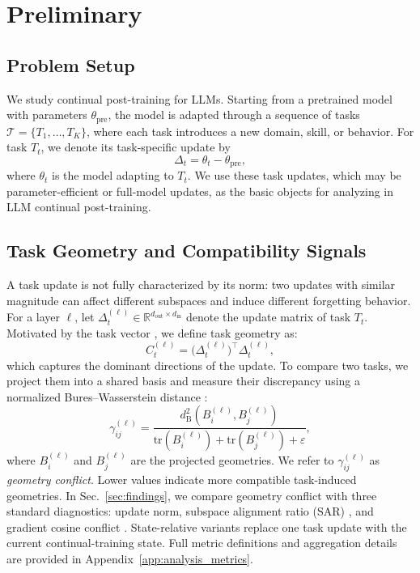\documentclass{article}
\begin{document}
\vspace{-0.2em}
\section{Preliminary}
\label{sec:background}


\subsection{Problem Setup}
We study continual post-training for LLMs. Starting from a pretrained model with parameters \(\theta_{\mathrm{pre}}\), the model is adapted through a sequence of tasks \(\mathcal{T}=\{T_1,\ldots,T_K\}\), where each task introduces a new domain, skill, or behavior. For task \(T_t\), we denote its task-specific update by
\[
\Delta_t = \theta_t - \theta_{\mathrm{pre}},
\]
where \(\theta_t\) is the model adapting to \(T_t\). We use these task updates, which may be parameter-efficient or full-model updates, as the basic objects for analyzing in LLM continual post-training.


\subsection{Task Geometry and Compatibility Signals}
\label{sec:task_geo_comp_sig}
A task update is not fully characterized by its norm: two updates with similar magnitude can affect different subspaces and induce different forgetting behavior. For a layer \(\ell\), let \(\Delta_t^{(\ell)} \in \mathbb{R}^{d_{\mathrm{out}}\times d_{\mathrm{in}}}\) denote the update matrix of task \(T_t\). 
Motivated by the task vector \cite{ilharcoediting}, we define task geometry as:
{\footnotesize
\[
C_t^{(\ell)} = \big(\Delta_t^{(\ell)}\big)^\top \Delta_t^{(\ell)} ,
\]
}
which captures the dominant directions of the update.
To compare two tasks, we project them into a shared basis and measure their discrepancy using a normalized Bures--Wasserstein distance \cite{bhatia2019bures}:
\vspace{-0.1em}
{\footnotesize
\[
\gamma_{ij}^{(\ell)}
=
\frac{
d_{\mathrm{B}}^2(B_i^{(\ell)},B_j^{(\ell)})
}{
\mathrm{tr}(B_i^{(\ell)})+\mathrm{tr}(B_j^{(\ell)})+\varepsilon
},
\]
}
where \(B_i^{(\ell)}\) and \(B_j^{(\ell)}\) are the projected geometries. We refer to \(\gamma_{ij}^{(\ell)}\) as \emph{geometry conflict}. Lower values indicate more compatible task-induced geometries. In Sec.~\ref{sec:findings}, we compare geometry conflict with three standard diagnostics: update norm, subspace alignment ratio (SAR) \cite{marczak2025no}, and gradient cosine conflict \cite{yu2020gradient}. State-relative variants replace one task update with the current continual-training state. Full metric definitions and aggregation details are provided in Appendix~\ref{app:analysis_metrics}.
\end{document}
